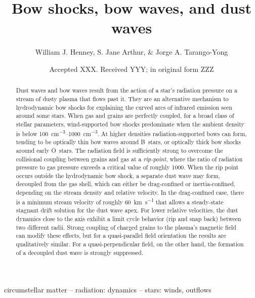 \documentclass[useAMS, usenatbib, a4paper]{mnras}
\title
{Bow shocks, bow waves, and dust waves}
\author[Henney, Arthur, \& Tarango Yong]{
  William J. Henney, S. Jane Arthur, \& Jorge A. Tarango-Yong\\
  \AddressCRyA
}
\date{Accepted XXX. Received YYY; in original form ZZZ}
\begin{document}
\label{firstpage}
\pagerange{\pageref{firstpage}--\pageref{lastpage}}
\maketitle
\begin{abstract}
  Dust waves and bow waves result from the action of a star's
  radiation pressure on a stream of dusty plasma that flows past it.
  They are an alternative mechanism to hydrodynamic bow shocks for
  explaining the curved arcs of infrared emission seen around some
  stars.  When gas and grains are perfectly coupled, for a broad class
  of stellar parameters, wind-supported bow shocks predominate when
  the ambient density is below \SIrange{100}{1000}{cm^{-3}}.  At
  higher densities radiation-supported bows can form, tending to be
  optically thin bow waves around B~stars, or optically thick bow
  shocks around early O~stars.  The radiation field is sufficiently
  strong to overcome the collisional coupling between grains and gas
  at a \textit{rip-point}, where the ratio of radiation pressure to
  gas pressure exceeds a critical value of roughly 1000.  When the rip
  point occurs outside the hydrodynamic bow shock, a separate dust
  wave may form, decoupled from the gas shell, which can either be
  drag-confined or inertia-confined, depending on the stream density
  and relative velocity.  In the drag-confined case, there is a
  minimum stream velocity of roughly \SI{60}{km.s^{-1}} that allows a
  steady-state stagnant drift solution for the dust wave apex.  For
  lower relative velocities, the dust dynamics close to the axis
  exhibit a limit cycle behavior (rip and snap back) between two
  different radii.  Strong coupling of charged grains to the plasma's
  magnetic field can modify these effects, but for a quasi-parallel
  field orientation the results are qualitatively similar. For a
  quasi-perpendicular field, on the other hand, the formation of a
  decoupled dust wave is strongly suppressed.
\end{abstract}

\begin{keywords}
  circumstellar matter -- radiation: dynamics -- stars: winds, outflows
\end{keywords}





\appendix



%

\bsp	%
\label{lastpage}
\end{document}
